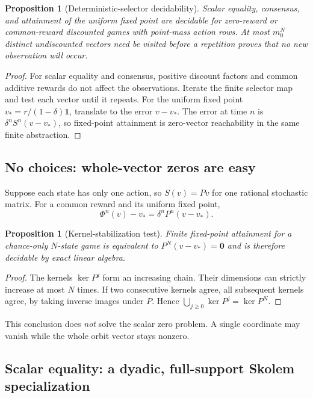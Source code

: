 \documentclass[11pt,letterpaper]{article}
\newtheorem{proposition}[theorem]{Proposition}
\theoremstyle{definition}
\theoremstyle{remark}
\newcommand{\one}{\mathbf 1}
\newcommand{\zero}{\mathbf 0}
\begin{document}
\begin{proposition}[Deterministic-selector decidability]\label{ste:ec:prop:selectors}
Scalar equality, consensus, and attainment of the uniform fixed point
are decidable for zero-reward or common-reward discounted games with
point-mass action rows. At most $m_0^N$ distinct undiscounted vectors need
be visited before a repetition proves that no new observation will occur.
\end{proposition}

\begin{proof}
For scalar equality and consensus, positive discount factors and common
additive rewards do not affect the observations. Iterate the finite
selector map and test each vector until it repeats. For the uniform fixed
point $v_*=r/(1-\delta)\one$, translate to the error $v-v_*$.
The error at time $n$ is $\delta^n S^n(v-v_*)$, so fixed-point attainment
is zero-vector reachability in the same finite abstraction.
\end{proof}

\subsection{No choices: whole-vector zeros are easy}

Suppose each state has only one action, so $S(v)=Pv$ for one rational
stochastic matrix. For a common reward and its uniform fixed point,
\[
 \Phi^n(v)-v_* = \delta^nP^n(v-v_*).
\]

\begin{proposition}[Kernel-stabilization test]
\label{ste:ec:prop:linear-point}
Finite fixed-point attainment for a chance-only $N$-state game is
 equivalent to $P^N(v-v_*)=\zero$ and is therefore decidable by exact
linear algebra.
\end{proposition}

\begin{proof}
The kernels $\ker P^j$ form an increasing chain. Their dimensions can
strictly increase at most $N$ times. If two consecutive kernels agree,
all subsequent kernels agree, by taking inverse images under $P$.
Hence $\bigcup_{j\geq0}\ker P^j=\ker P^N$.
\end{proof}

This conclusion does \emph{not} solve the scalar zero problem. A single
coordinate may vanish while the whole orbit vector stays nonzero.

\subsection{Scalar equality: a dyadic, full-support Skolem specialization}
\end{document}
